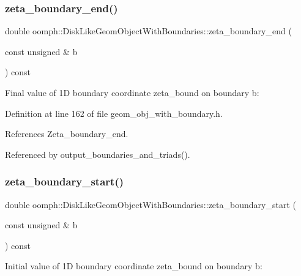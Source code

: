 \subsubsection{\texorpdfstring{zeta\+\_\+boundary\+\_\+end()}{zeta\_boundary\_end()}}
{\footnotesize\ttfamily double oomph\+::\+Disk\+Like\+Geom\+Object\+With\+Boundaries\+::zeta\+\_\+boundary\+\_\+end (\begin{DoxyParamCaption}\item[{const unsigned \&}]{b }\end{DoxyParamCaption}) const\hspace{0.3cm}{\ttfamily [inline]}}



Final value of 1D boundary coordinate zeta\+\_\+bound on boundary b\+: 



Definition at line 162 of file geom\+\_\+obj\+\_\+with\+\_\+boundary.\+h.



References Zeta\+\_\+boundary\+\_\+end.



Referenced by output\+\_\+boundaries\+\_\+and\+\_\+triads().

\mbox{\label{classoomph_1_1DiskLikeGeomObjectWithBoundaries_aea863d508553cc984ba04a8a3b0fed0e}} 
\subsubsection{\texorpdfstring{zeta\+\_\+boundary\+\_\+start()}{zeta\_boundary\_start()}}
{\footnotesize\ttfamily double oomph\+::\+Disk\+Like\+Geom\+Object\+With\+Boundaries\+::zeta\+\_\+boundary\+\_\+start (\begin{DoxyParamCaption}\item[{const unsigned \&}]{b }\end{DoxyParamCaption}) const\hspace{0.3cm}{\ttfamily [inline]}}



Initial value of 1D boundary coordinate zeta\+\_\+bound on boundary b\+: 



